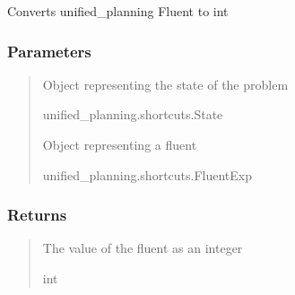 \documentclass[letterpaper,10pt,english]{sphinxmanual}
\begin{document}
\begin{fulllineitems}
\label{\detokenize{api_reference/dungeon_resolver/GUI:GUI.fluent_to_int}}
\pysigstartsignatures
{}
\pysigstopsignatures
\sphinxAtStartPar
Converts unified\_planning Fluent to int


\subsubsection{Parameters}
\label{\detokenize{api_reference/dungeon_resolver/GUI:id2}}\begin{quote}\begin{description}
\sphinxAtStartPar
Object representing the state of the problem

\sphinxAtStartPar
unified\_planning.shortcuts.State

\sphinxAtStartPar
Object representing a fluent

\sphinxAtStartPar
unified\_planning.shortcuts.FluentExp

\end{description}\end{quote}


\subsubsection{Returns}
\label{\detokenize{api_reference/dungeon_resolver/GUI:returns}}\begin{quote}\begin{description}
\sphinxAtStartPar
The value of the fluent as an integer

\sphinxAtStartPar
int

\end{description}\end{quote}

\end{fulllineitems}

\end{document}

